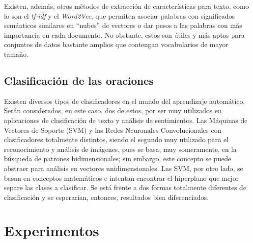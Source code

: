 \documentclass[conference]{IEEEtran}
\begin{document}
        Existen, además, otros métodos de extracción de características para texto, como lo son el \textit{tf-idf} y el \textit{Word2Vec}, que permiten asociar palabras con significados semánticos similares en ``nubes'' de vectores o dar pesos a las palabras con más importancia en cada documento. No obstante, estos son útiles y más aptos para conjuntos de datos bastante amplios que contengan vocabularios de mayor tamaño.
    
    
    
    
    \subsection{Clasificación de las oraciones}
    
        Existen diversos tipos de clasificadores en el mundo del aprendizaje automático. Serán considerados, en este caso, dos de estos, por ser muy utilizados en aplicaciones de clasificación de texto y análisis de sentimientos. Las Máquinas de Vectores de Soporte (SVM) y las Redes Neuronales Convolucionales con clasificadores totalmente distintos, siendo el segundo muy utilizado para el reconocimiento y análisis de imágenes, pues se basa, muy someramente, en la búsqueda de patrones bidimensionales; sin embargo, este concepto se puede abstraer para análisis en vectores unidimensionales. Las SVM, por otro lado, se basan en conceptos matemáticos e intentan encontrar el hiperplano que mejor separe las clases a clasificar. Se está frente a dos formas totalmente diferentes de clasificación y se esperarían, entonces, resultados bien diferenciados.
    
    



\section{Experimentos} \label{sec:experimentos}
\end{document}
